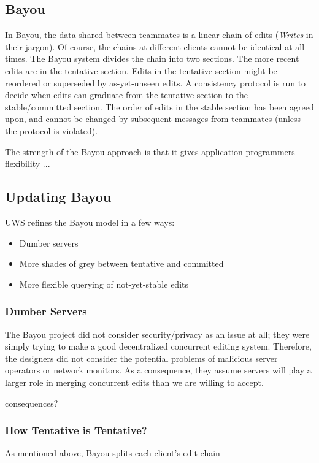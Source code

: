 \documentclass{article}
\begin{document}
\subsection{Bayou}

In Bayou, the data shared between teammates is a linear chain of edits (\emph{Writes} in their jargon).
Of course, the chains at different clients cannot be identical at all times.
The Bayou system divides the chain into two sections.
The more recent edits are in the tentative section.
Edits in the tentative section might be reordered or superseded by as-yet-unseen edits.
A consistency protocol is run to decide when edits can graduate from the tentative section to the stable/committed section.
The order of edits in the stable section has been agreed upon, and cannot be changed by subsequent messages from teammates (unless the protocol is violated).

The strength of the Bayou approach is that it gives application programmers flexibility ...

\subsection{Updating Bayou}

UWS refines the Bayou model in a few ways:

\begin{itemize}
\item Dumber servers
\item More shades of grey between tentative and committed
\item More flexible querying of not-yet-stable edits
\end{itemize}

\subsubsection{Dumber Servers}

The Bayou project did not consider security/privacy as an issue at all; they were simply trying to make a good decentralized concurrent editing system.
Therefore, the designers did not consider the potential problems of malicious server operators or network monitors.
As a consequence, they assume servers will play a larger role in merging concurrent edits than we are willing to accept.

consequences?

\subsubsection{How Tentative is Tentative?}

As mentioned above, Bayou splits each client's edit chain 
\end{document}
